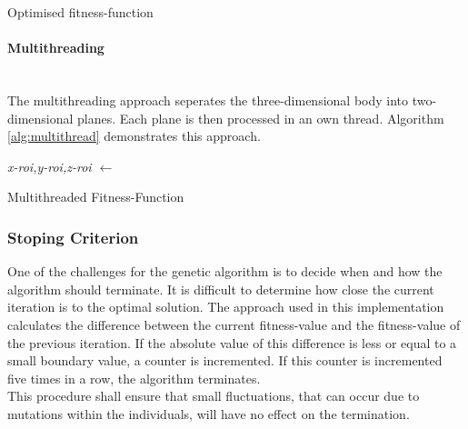 \documentclass[12pt]{article}
\begin{document}
\begin{algorithm}[H]
\label{alg:scalefif}

\caption{Optimised fitness-function}
\end{algorithm} 






\paragraph{Multithreading}
\label{para:multithreading}
~\\ 
The multithreading approach seperates the three-dimensional body into two-dimensional planes. Each plane is then processed in an own thread. Algorithm \ref{alg:multithread} demonstrates this approach.\\

 \begin{algorithm}[H]
 \label{alg:multithread}

 \emph{x-roi,y-roi,z-roi $\leftarrow$}   \;
 \caption{Multithreaded Fitness-Function}
 \end{algorithm} 

\subsubsection{Stoping Criterion}
\label{subsubsec: stopcrit}
One of the challenges for the genetic algorithm is to decide when and how the algorithm should terminate. It is difficult to determine how close the current iteration is to the optimal solution. The approach used in this implementation calculates the difference between the current fitness-value and the fitness-value of the previous iteration. If the absolute value of this difference is less or equal to a small boundary value, a counter is incremented. If this counter is incremented five times in a row, the algorithm terminates. \\ 
This procedure shall ensure that small fluctuations, that can occur due to mutations within the individuals, will have no effect on the termination. \\
\end{document}
